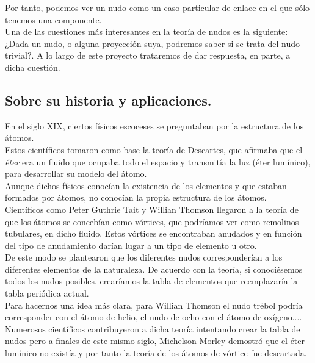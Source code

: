 \documentclass[14pt]{extarticle}
\begin{document}
    Por tanto, podemos ver un nudo como un caso particular de enlace en el que sólo tenemos una componente.\\
    
  Una de las cuestiones más interesantes en la teoría de nudos es la siguiente: \\
  ¿Dada un nudo, o alguna proyección suya, podremos saber si se trata del nudo trivial?. A lo largo de este proyecto trataremos de dar respuesta, en parte, a dicha cuestión.\\
  
 
  \newpage
\subsection{Sobre su historia y aplicaciones.}
En el siglo XIX, ciertos físicos escoceses se preguntaban por la estructura de los átomos.\\
Estos científicos tomaron como base la teoría de Descartes, que afirmaba que el \textit{éter} era un fluido que ocupaba todo el espacio y transmitía la luz (éter lumínico), para desarrollar su modelo del átomo. \\
Aunque dichos físicos conocían la existencia de los elementos y que estaban formados por átomos, no conocían la propia estructura de los átomos. \\

Científicos como Peter Guthrie Tait y Willian Thomson llegaron a la teoría de que los átomos se concebían como vórtices, que podríamos ver como remolinos tubulares, en dicho fluido. Estos vórtices se encontraban anudados y en función del tipo de anudamiento darían lugar a un tipo de elemento u otro.\\
De este modo se plantearon que los diferentes nudos corresponderían a los diferentes elementos de la naturaleza. De acuerdo con la teoría, si conociésemos todos los nudos posibles, crearíamos la tabla de elementos que reemplazaría la tabla periódica actual. \\

Para hacernos una idea más clara, para Willian Thomson el nudo trébol podría corresponder con el átomo de helio, el nudo de ocho con el átomo de oxígeno....\\

Numerosos científicos contribuyeron a dicha teoría intentando crear la tabla de nudos pero a finales de este mismo siglo, Michelson-Morley demostró que el éter lumínico no existía y por tanto la teoría de los átomos de vórtice fue descartada. \\
\end{document}
